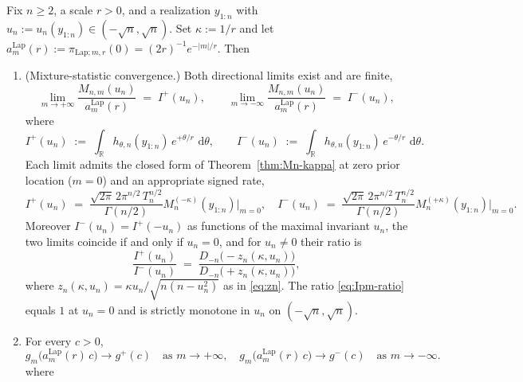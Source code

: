 \documentclass[12pt, a4paper]{report}
\newcommand{\dd}{\,\mathrm{d}}
\newcommand{\Lap}{\mathrm{Lap}}
\newcommand{\1}{\mathbf{1}}
\begin{document}
\begin{theorem}\label{thm:laplace-limits}
Fix $n\geq 2$, a scale $r>0$, and a realization $y_{1:n}$ with
$u_n := u_n(y_{1:n})\in(-\sqrt n,\sqrt n)$. Set $\kappa := 1/r$ and let
$a_m^{\Lap}(r) := \pi_{\Lap;m,r}(0) = (2r)^{-1}e^{-|m|/r}$.
Then 
\begin{enumerate}
    \item[(a)] (Mixture-statistic convergence.) Both directional limits exist and are finite,
\begin{equation}\label{eq:Lap-limits}
  \lim_{m\to+\infty}\frac{M_{n,m}(u_n)}{a_m^{\Lap}(r)}
  \;=\;I^+(u_n),
  \qquad
  \lim_{m\to-\infty}\frac{M_{n,m}(u_n)}{a_m^{\Lap}(r)}
  \;=\;I^-(u_n),
\end{equation}
where
\begin{equation}\label{eq:Ipm-def}
  I^+(u_n) \;:=\;\int_\mathbb{R} h_{\theta,n}(y_{1:n})\,e^{+\theta/r}\,\dd\theta,
  \qquad
  I^-(u_n) \;:=\;\int_\mathbb{R} h_{\theta,n}(y_{1:n})\,e^{-\theta/r}\,\dd\theta.
\end{equation}
Each limit admits the closed form of Theorem~\ref{thm:Mn-kappa} at
zero prior location ($m=0$) and an appropriate signed rate,
\begin{equation}\label{eq:Ipm-closed}
  I^+(u_n) \;=\; \frac{\sqrt{2\pi} \, 2\pi^{n/2} \, T_n^{n/2} }{\Gamma(n/2)} M_n^{(-\kappa)}(y_{1:n})\big|_{m=0},
  \quad
  I^-(u_n) \;=\; \frac{\sqrt{2\pi} \, 2\pi^{n/2} \, T_n^{n/2} }{\Gamma(n/2)} M_n^{(+\kappa)}(y_{1:n})\big|_{m=0}.
\end{equation}
Moreover $I^-(u_n) = I^+(-u_n)$ as functions of the maximal invariant
$u_n$, the two limits coincide if and only if $u_n=0$, and for
$u_n\neq 0$ their ratio is
\begin{equation}\label{eq:Ipm-ratio}
  \frac{I^+(u_n)}{I^-(u_n)}
  \;=\;\frac{D_{-n}\!\bigl(-z_n(\kappa,u_n)\bigr)}
            {D_{-n}\!\bigl(+z_n(\kappa,u_n)\bigr)},
\end{equation}
where $z_n(\kappa,u_n) = \kappa u_n/\sqrt{n(n-u_n^2)}$ as in
\eqref{eq:zn}. The ratio \eqref{eq:Ipm-ratio} equals $1$ at $u_n=0$ and
is strictly monotone in $u_n$ on $(-\sqrt n,\sqrt n)$.
    \item[(b)] For every $c>0$,
\begin{equation}\label{eq:gm-conv}
  g_m\!\bigl(a_m^{\Lap}(r)\,c\bigr) \longrightarrow g^+(c)
  \quad\text{as }m\to+\infty,
  \quad
  g_m\!\bigl(a_m^{\Lap}(r)\,c\bigr) \longrightarrow g^-(c)
  \quad\text{as }m\to-\infty.
\end{equation}
where 
\begin{equation}\label{eq:gm-Lap}

\end{equation}
\end{enumerate}
\end{theorem}
\end{document}
